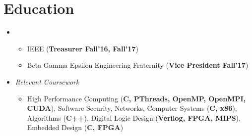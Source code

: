 \documentclass[11pt,letterpaper,sans]{moderncv}
\begin{document}
\makecvtitle

\vspace{-45pt}





\section{Education}
\vspace{2pt}


\begin{itemize}

\item[] {}
\vspace{-1mm}	\begin{itemize}
	 \item IEEE (\textbf{Treasurer Fall'16, Fall'17})
	 \item Beta Gamma Epsilon Engineering Fraternity (\textbf{Vice President Fall'17})
	\end{itemize}
	
\item[] {\textit{Relevant Coursework}}
\vspace{1pt} \begin{itemize}
               \item High Performance Computing (\textbf{C, PThreads, OpenMP, OpenMPI, CUDA}), 
               Software Security, 
               Networks,
               Computer Systems (\textbf{C, x86}),
               Algorithms (\textbf{C++}),
               Digital Logic Design 
               (\textbf{Verilog, FPGA, MIPS}), 
               Embedded Design (\textbf{C, FPGA})
              \end{itemize}


\end{itemize}
\vspace{-3pt}
\end{document}
